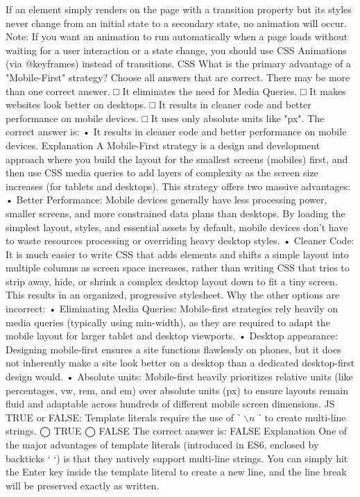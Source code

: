 If an element simply renders on the page with a transition property but its styles never change from an initial state to a secondary state, no animation will occur.
Note: If you want an animation to run automatically when a page loads without waiting for a user interaction or a state change, you should use CSS Animations (via @keyframes) instead of transitions.
CSS
What is the primary advantage of a "Mobile-First" strategy?
Choose all answers that are correct. There may be more than one correct answer.
□ It eliminates the need for Media Queries.
□ It makes websites look better on desktops.
□ It results in cleaner code and better performance on mobile devices.
□ It uses only absolute units like "px".
The correct answer is:
•	It results in cleaner code and better performance on mobile devices.
Explanation
A Mobile-First strategy is a design and development approach where you build the layout for the smallest screens (mobiles) first, and then use CSS media queries to add layers of complexity as the screen size increases (for tablets and desktops).
This strategy offers two massive advantages:
•	Better Performance: Mobile devices generally have less processing power, smaller screens, and more constrained data plans than desktops. By loading the simplest layout, styles, and essential assets by default, mobile devices don't have to waste resources processing or overriding heavy desktop styles.
•	Cleaner Code: It is much easier to write CSS that adds elements and shifts a simple layout into multiple columns as screen space increases, rather than writing CSS that tries to strip away, hide, or shrink a complex desktop layout down to fit a tiny screen. This results in an organized, progressive stylesheet.
Why the other options are incorrect:
•	Eliminating Media Queries: Mobile-first strategies rely heavily on media queries (typically using min-width), as they are required to adapt the mobile layout for larger tablet and desktop viewports.
•	Desktop appearance: Designing mobile-first ensures a site functions flawlessly on phones, but it does not inherently make a site look better on a desktop than a dedicated desktop-first design would.
•	Absolute units: Mobile-first heavily prioritizes relative units (like percentages, vw, rem, and em) over absolute units (px) to ensure layouts remain fluid and adaptable across hundreds of different mobile screen dimensions.
JS
TRUE or FALSE: Template literals require the use of ˋ $\backslash n$ ˋ to create multi-line strings.
◯ TRUE
◯ FALSE
The correct answer is:
FALSE
Explanation
One of the major advantages of template literals (introduced in ES6, enclosed by backticks ` `) is that they natively support multi-line strings. You can simply hit the Enter key inside the template literal to create a new line, and the line break will be preserved exactly as written.
